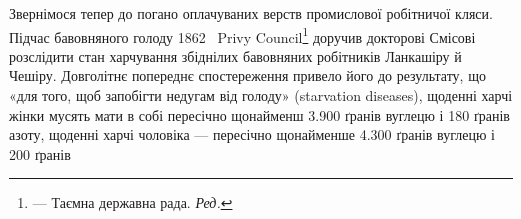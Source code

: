 Звернімося тепер до погано оплачуваних верств промислової
робітничої кляси. Підчас бавовняного голоду 1862~ Privy
Council\footnote*{
— Таємна державна рада. \emph{Ред.}
} доручив докторові Смісові розслідити стан харчування
збіднілих бавовняних робітників Ланкашіру й Чешіру. Довголітнє
попереднє спостереження привело його до результату, що
«для того, щоб запобігти недугам від голоду» (starvation diseases),
щоденні харчі жінки мусять мати в собі пересічно щонайменш
\num{3.900} ґранів вуглецю і 180 ґранів азоту, щоденні харчі
чоловіка — пересічно щонайменше \num{4.300} ґранів вуглецю і 200 ґранів
\parbreak{}  %
